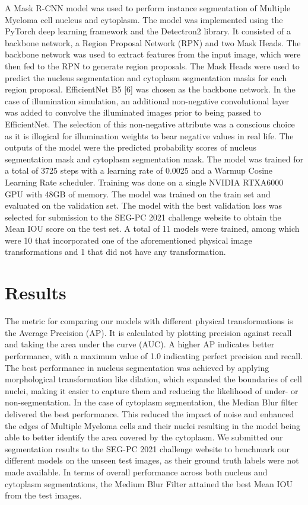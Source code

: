 \documentclass{article}
\begin{document}
A Mask R-CNN model was used to perform instance segmentation of Multiple Myeloma cell nucleus and cytoplasm. The model was implemented using the PyTorch deep learning framework and the Detectron2 library. It consisted of a backbone network, a Region Proposal Network (RPN) and two Mask Heads. The backbone network was used to extract features from the input image, which were then fed to the RPN to generate region proposals. The Mask Heads were used to predict the nucleus segmentation and cytoplasm segmentation masks for each region proposal. EfficientNet B5 [6] was chosen as the backbone network. In the case of illumination simulation, an additional non-negative convolutional layer was added to convolve the illuminated images prior to being passed to EfficientNet. The selection of this non-negative attribute was a conscious choice as it is illogical for illumination weights to bear negative values in real life. The outputs of the model were the predicted probability scores of nucleus segmentation mask and cytoplasm segmentation mask. The model was trained for a total of 3725 steps with a learning rate of 0.0025 and a Warmup Cosine Learning Rate scheduler. Training was done on a single NVIDIA RTXA6000 GPU with 48GB of memory. The model was trained on the train set and evaluated on the validation set. The model with the best validation loss was selected for submission to the SEG-PC 2021 challenge website to obtain the Mean IOU score on the test set. A total of 11 models were trained, among which were 10 that incorporated one of the aforementioned physical image transformations and 1 that did not have any transformation.

\section{Results}

The metric for comparing our models with different physical transformations is the Average Precision (AP). It is calculated by plotting precision against recall and taking the area under the curve (AUC). A higher AP indicates better performance, with a maximum value of 1.0 indicating perfect precision and recall. The best performance in nucleus segmentation was achieved by applying morphological transformation like dilation, which expanded the boundaries of cell nuclei, making it easier to capture them and reducing the likelihood of under- or non-segmentation. In the case of cytoplasm segmentation, the Median Blur filter delivered the best performance. This reduced the impact of noise and enhanced the edges of Multiple Myeloma cells and their nuclei resulting in the model being able to better identify the area covered by the cytoplasm. We submitted our segmentation results to the SEG-PC 2021 challenge website to benchmark our different models on the unseen test images, as their ground truth labels were not made available. In terms of overall performance across both nucleus and cytoplasm segmentations, the Medium Blur Filter attained the best Mean IOU from the test images.
\end{document}
